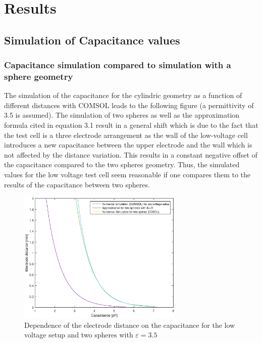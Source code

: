 
\chapter{Results}
\label{chp.results}
\section{Simulation of Capacitance values}
\subsection{Capacitance simulation compared to simulation with a sphere geometry}
The simulation of the capacitance for the cylindric geometry as a function of different distances with COMSOL leads to the following figure (a permittivity of 3.5 is assumed). The simulation of two spheres as well as the approximation formula cited in equation 3.1 result in a general 
shift which is due to the fact that the test cell is a three electrode arrangement as the wall of the
low-voltage cell introduces a new capacitance between the upper electrode and the wall which is not affected by the distance variation. This results in a constant negative offset of the capacitance compared to the 
two spheres geometry. Thus, the simulated values for the low voltage test cell seem reasonable if one compares them to the results of the capacitance between two spheres. \newline 

\begin{figure}[H]
	\centering
	\includegraphics[width=0.7\textwidth]{figures/Method/Part1_d_C0/Comparison_Low_voltage_Two_spheres.eps}		
	\caption[Kurze Abbildungsbeschreibung]{Dependence of the electrode distance on the capacitance for the low voltage setup and two spheres with $\varepsilon = 3.5$ } 
	\label{fig.waveforms}
\end{figure}


